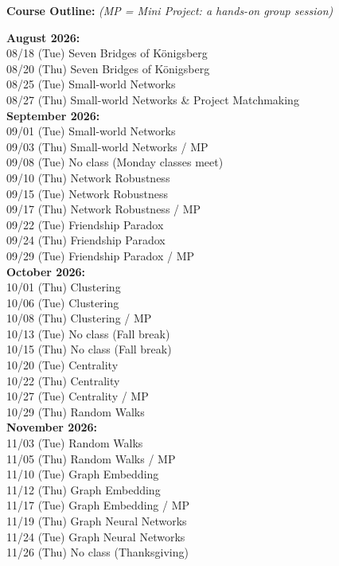 \documentclass[11pt, a4paper]{article}
\begin{document}
\noindent \textbf{Course Outline:} \textit{(MP = Mini Project: a hands-on group session)}
\begin{center}
\begin{minipage}{5in}
\begin{flushleft}
\textbf{August 2026:} \\
08/18 (Tue) \dotfill Seven Bridges of K\"onigsberg \\
08/20 (Thu) \dotfill Seven Bridges of K\"onigsberg \\
08/25 (Tue) \dotfill Small-world Networks \\
08/27 (Thu) \dotfill Small-world Networks \& Project Matchmaking\\

\textbf{September 2026:} \\
09/01 (Tue) \dotfill Small-world Networks \\
09/03 (Thu) \dotfill Small-world Networks / MP \\
09/08 (Tue) \dotfill No class (Monday classes meet) \\
09/10 (Thu) \dotfill Network Robustness \\
09/15 (Tue) \dotfill Network Robustness \\
09/17 (Thu) \dotfill Network Robustness / MP \\
09/22 (Tue) \dotfill Friendship Paradox \\
09/24 (Thu) \dotfill Friendship Paradox \\
09/29 (Tue) \dotfill Friendship Paradox / MP \\

\textbf{October 2026:} \\
10/01 (Thu) \dotfill Clustering \\
10/06 (Tue) \dotfill Clustering \\
10/08 (Thu) \dotfill Clustering / MP \\
10/13 (Tue) \dotfill No class (Fall break) \\
10/15 (Thu) \dotfill No class (Fall break) \\
10/20 (Tue) \dotfill Centrality \\
10/22 (Thu) \dotfill Centrality \\
10/27 (Tue) \dotfill Centrality / MP \\
10/29 (Thu) \dotfill Random Walks \\

\textbf{November 2026:} \\
11/03 (Tue) \dotfill Random Walks \\
11/05 (Thu) \dotfill Random Walks / MP \\
11/10 (Tue) \dotfill Graph Embedding \\
11/12 (Thu) \dotfill Graph Embedding \\
11/17 (Tue) \dotfill Graph Embedding / MP \\
11/19 (Thu) \dotfill Graph Neural Networks \\
11/24 (Tue) \dotfill Graph Neural Networks \\
11/26 (Thu) \dotfill No class (Thanksgiving) \\


\end{flushleft}
\end{minipage}
\end{center}
\end{document}
